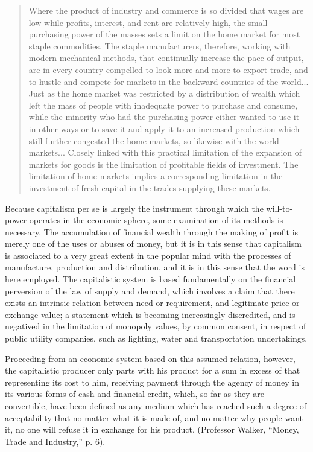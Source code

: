\documentclass{book}
\begin{document}
\begin{quotation}
	Where the product of industry and commerce is so divided that wages are low while profits, interest, and rent are relatively high, the small purchasing power of the masses sets a limit on the home market for most staple commodities. The staple manufacturers, therefore, working with modern mechanical methods, that continually increase the pace of output, are in every country compelled to look more and more to export trade, and to hustle and compete for markets in the backward countries of the world... Just as the home market was restricted by a distribution of wealth which left the mass of people with inadequate power to purchase and consume, while the minority who had the purchasing power either wanted to use it in other ways or to save it and apply it to an increased production which still further congested the home markets, so likewise with the world markets... Closely linked with this practical limitation of the expansion of markets for goods is the limitation of profitable fields of investment. The limitation of home markets implies a corresponding limitation in the investment of fresh capital in the trades supplying these markets.
\end{quotation}

Because capitalism per se is largely the instrument through which the will-to-power operates in the economic sphere, some examination of its methods is necessary. The accumulation of financial wealth through the making of profit is merely one of the uses or abuses of money, but it is in this sense that capitalism is associated to a very great extent in the popular mind with the processes of manufacture, production and distribution, and it is in this sense that the word is here employed. The capitalistic system is based fundamentally on the financial perversion of the law of supply and demand, which involves a claim that there exists an intrinsic relation between need or requirement, and legitimate price or exchange value; a statement which is becoming increasingly discredited, and is negatived in the limitation of monopoly values, by common consent, in respect of public utility companies, such as lighting, water and transportation undertakings.

Proceeding from an economic system based on this assumed relation, however, the capitalistic producer only parts with his product for a sum in excess of that representing its cost to him, receiving payment through the agency of money in its various forms of cash and financial credit, which, so far as they are convertible, have been defined as any medium which has reached such a degree of acceptability that no matter what it is made of, and no matter why people want it, no one will refuse it in exchange for his product. (Professor Walker, “Money, Trade and Industry,” p. 6).
\end{document}
